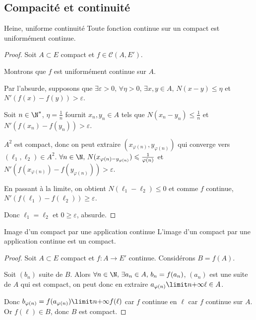 \subsection{Compacité et continuité}

\begin{theoreme}{Heine, uniforme continuité}{}
    Toute fonction continue sur un compact est uniformément continue. 
\end{theoreme}


\begin{proof}
    Soit $A \subset E$ compact et $f \in \mathscr C(A, E')$. 

    Montrons que $f$ est uniformément continue sur $A$. 

    Par l'absurde, supposons que $\exists \varepsilon > 0, \, \forall \eta > 0, \, \exists x, y \in A, \, N(x - y) \leqslant \eta$ et $N'(f(x) - f(y)) > \varepsilon$.

    Soit $n \in \N^*$, $\eta = \frac 1 n$ fournit $x_n, y_n \in A$ tels que $N(x_n - y_n) \leqslant \frac 1 n$
    et $N'(f(x_n) - f(y_n)) > \varepsilon$.

    $A^2$ est compact, donc on peut extraire $(x_{\varphi(n)}, y_{\varphi(n)})$ qui converge vers $(\ell_1, \ell_2) \in A^2$.
    $\forall n \in \N, \, N(x_{\varphi(n) - y_{\varphi(n)}}) \leqslant \frac 1 {\varphi(n)}$ et $N'(f(x_{\varphi(n)}) - f(y_{\varphi(n)})) > \varepsilon$.

    En passant à la limite, on obtient $N(\ell_1 - \ell_2) \leqslant 0$ et comme $f$ continue, 
    $N'(f(\ell_1) - f(\ell_2)) \geqslant \varepsilon$.

    Donc $\ell_1 = \ell_2$ et $0 \geqslant \varepsilon$, absurde.
\end{proof}

\begin{theoreme}{Image d'un compact par une application continue}{}
    L'image d'un compact par une application continue est un compact. 
\end{theoreme}


\begin{proof}
    Soit $A \subset E$ compact et $f : A \to E'$ continue. Considérons $B = f(A)$. 

    Soit $(b_n)$ suite de $B$. Alors $\forall n \in \N, \, \exists a_n \in A, \, b_n = f(a_n)$,
    $(a_n)$ est une suite de $A$ qui est compact, on peut donc en extraire 
    $a_{\varphi(n)} \limit n {+ \infty} \ell \in A$. 

    Donc $b_{\varphi(n)} = f(a_{\varphi(n)}) \limit n {+ \infty} f(\ell) $ car $f$ continue en 
    $\ell$ car $f$ continue sur $A$. Or $f(\ell) \in B$, donc $B$ est compact.
\end{proof}

